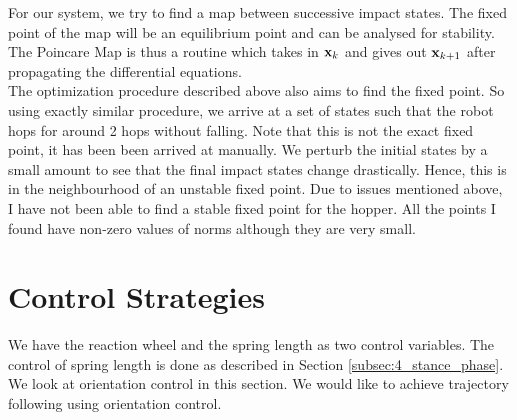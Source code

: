 For our system, we try to find a map between successive impact states. The fixed point of the map will be 
an equilibrium point and can be analysed for stability. The Poincare Map is thus a routine which takes in 
${\bf x}_k$ and gives out ${\bf x}_{k+1}$ after propagating the differential equations.\\

The optimization 
procedure described above also aims to find the fixed point. So using exactly similar procedure, we arrive 
at a set of states such that the robot hops for around 2 hops without falling. Note that this is not the 
exact fixed point, it has been been arrived at manually. We perturb the initial states by a small amount 
to see that the final impact states change drastically. Hence, this is in the neighbourhood of an unstable 
fixed point. Due to issues mentioned above, I have not been able to find a stable fixed point for the 
hopper. All the points I found have non-zero values of norms although they are very small.\\
\vspace{0.1in}



\section{Control Strategies}
We have the reaction wheel and the spring length as two control variables. The control of spring length is 
done as described in Section \ref{subsec:4_stance_phase}. We look at orientation control in this section. We would like to achieve trajectory following using orientation control. 
